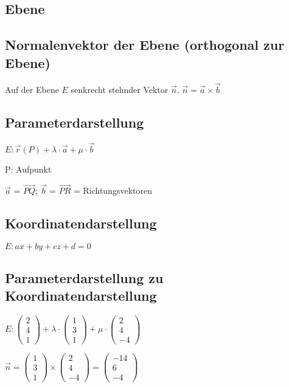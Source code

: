 \begin{multicols*}{3}
\section{Ebene}
\subsection{Normalenvektor der Ebene (orthogonal zur Ebene)}
{Auf der Ebene $ E $ senkrecht stehnder Vektor $\vec{n}$.}
$\vec{n} = \vec{a} \times \vec{b}$

\subsection{Parameterdarstellung}

{\large $ E: \vec{r}(P) + \lambda \cdot \vec{a} + \mu \cdot \vec{b} $}

{P: Aufpunkt}

{$ \vec{a}$ = $\overrightarrow{PQ} $; $ \vec{b}$ = $\overrightarrow{PR} $ = Richtungsvektoren}



\subsection{Koordinatendarstellung}
{$E: ax + by + cz + d = 0 $}

\subsection{Parameterdarstellung zu Koordinatendarstellung}

$ E: \begin{pmatrix}
2\\
4\\
1
\end{pmatrix} + \lambda \cdot 
\begin{pmatrix}
1\\
3\\
1 
\end{pmatrix} + \mu \cdot
\begin{pmatrix}
2\\
4\\
-4 
\end{pmatrix}$

 $\vec{n}= 
\begin{pmatrix}
1\\
3\\
1
\end{pmatrix} \times \begin{pmatrix}
2\\
4\\
-4 
\end{pmatrix} = \begin{pmatrix}
-14\\
6\\
-4 
\end{pmatrix} $


\end{multicols*}
